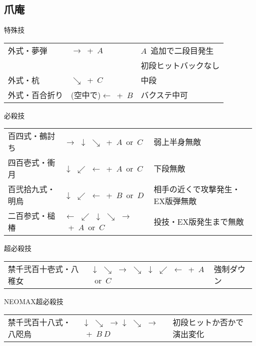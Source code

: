 \documentclass[a4j,11pt]{jarticle}
\def\hado{$\downarrow$ $\searrow$ $\rightarrow$}%
\def\tatsu{$\downarrow$ $\swarrow$ $\leftarrow$}%
\def\syoryu{$\rightarrow$ $\downarrow$ $\searrow$}%
\def\yoga{$\leftarrow$ $\swarrow$ $\downarrow$ $\searrow$ $\rightarrow$}%
\def\ryuko{$\downarrow$ $\searrow$ $\rightarrow$ $\searrow$ $\downarrow$ $\swarrow$ $\leftarrow$}%
\begin{document}
\subsection{爪庵}
\begin{itembox}[l]{特殊技}
\begin{tabular}{lll}
外式・夢弾&$\rightarrow$\ +\ $A$&$A$\ 追加で二段目発生\\
&&初段ヒットバックなし\\%
外式・杭&$\searrow$\ +\ $C$&中段\\%
外式・百合折り&(空中で)$\leftarrow$\ +\ $B$&バクステ中可%
\end{tabular}
\end{itembox}
\begin{itembox}[l]{必殺技}
\begin{tabular}{lll}
百四式・鵺討ち&\syoryu\ +\ $A$\ or\ $C$&弱上半身無敵\\%
四百壱式・衝月&\tatsu\ +\ $A$\ or\ $C$&下段無敵\\ %
百弐拾九式・明烏&\tatsu\ +\ $B$\ or\ $D$&相手の近くで攻撃発生・EX版弾無敵\\ %
二百参式・槌椿&\yoga\ +\ $A$\ or\ $C$&投技・EX版発生まで無敵%
\end{tabular}
\end{itembox}
\begin{itembox}[l]{超必殺技}
\begin{tabular}{lll}
禁千弐百十壱式・八稚女&\ryuko\ +\ $A$\ or\ $C$&強制ダウン\\ %
\end{tabular}
\end{itembox}
\begin{itembox}[l]{NEOMAX超必殺技}
\begin{tabular}{lll}
禁千弐百十八式・八咫烏&\hado\hado\ +\ $B\ D$&初段ヒットか否かで演出変化%
\end{tabular}
\end{itembox}
\newpage
\end{document}
